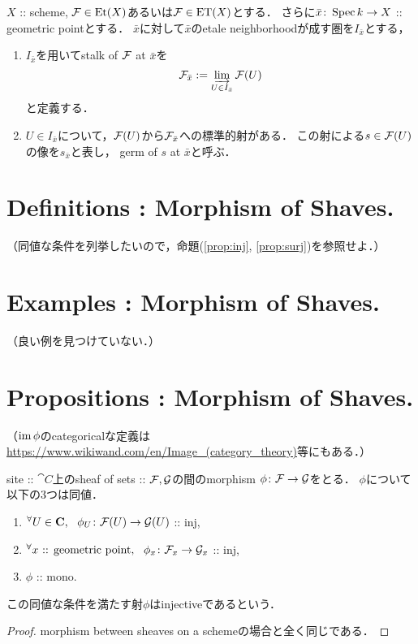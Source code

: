 \documentclass[a4paper, dvipdfmx]{jsarticle}
\begin{document}
\begin{Def}
    $X$ :: scheme,
    $\mathcal{F} \in \mathrm{Et}(X)$あるいは$\mathcal{F} \in \mathrm{ET}(X)$とする．
    さらに$\bar{x} \colon \operatorname{Spec} k \to X$ :: geometric pointとする．
    $\bar{x}$に対して$\bar{x}$のetale neighborhoodが成す圏を$I_{\bar{x}}$とする，

    \begin{enumerate}[label=(\roman*)]
        \item 
        $I_{\bar{x}}$を用いてstalk of $\mathcal{F}$ at $\bar{x}$を
        \[ \mathcal{F}_{\bar{x}}:=\varinjlim_{U \in I_{\bar{x}}} \mathcal{F}(U) \]
        と定義する．

        \item
        $U \in I_{\bar{x}}$について，$\mathcal{F}(U)$から$\mathcal{F}_{\bar{x}}$への標準的射がある．
        この射による$s \in \mathcal{F}(U)$の像を$s_{\bar{x}}$と表し，
        germ of $s$ at $\bar{x}$と呼ぶ．
    \end{enumerate}
\end{Def}

\section{Definitions : Morphism of Shaves.}
\begin{Def}
    （同値な条件を列挙したいので，命題(\ref{prop:inj}, \ref{prop:surj})を参照せよ．）
\end{Def}

\section{Examples : Morphism of Shaves.}
（良い例を見つけていない．）

\section{Propositions : Morphism of Shaves.}
\begin{Def}
    （$\operatorname{im} \phi$のcategoricalな定義は\url{https://www.wikiwand.com/en/Image_(category_theory)}等にもある．）
\end{Def}

\begin{Prop} \label{prop:inj}
    site :: $\cat{C}$上のsheaf of sets :: $\mathcal{F}, \mathcal{G}$の間のmorphism
    $\phi \colon \mathcal{F} \to \mathcal{G}$をとる．
    $\phi$について以下の$3$つは同値．
    \begin{enumerate}
        \item ${}^{\forall} U \in \mathbf{C},~~ \phi_{U} \colon \mathcal{F}(U) \to \mathcal{G}(U)$ :: inj,
        \item ${}^{\forall} x \text{ :: geometric point},~~ \phi_{x} \colon \mathcal{F}_x \to \mathcal{G}_x$ :: inj,
        \item $\phi$ :: mono.
    \end{enumerate}
    この同値な条件を満たす射$\phi$はinjectiveであるという．
\end{Prop}
\begin{proof}
    morphism between sheaves on a schemeの場合と全く同じである．
\end{proof}
\end{document}
